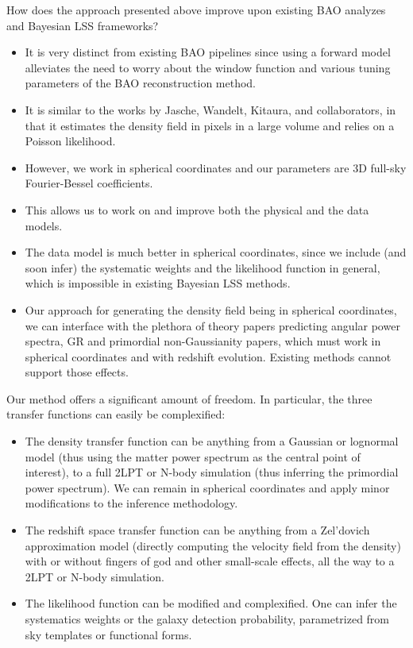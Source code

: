 \documentclass{aastex6}
\begin{document}
How does the approach presented above improve upon existing BAO analyzes and Bayesian LSS frameworks?
\begin{itemize}
	\item It is very distinct from existing BAO pipelines since using a forward model alleviates the need to worry about the window function and various tuning parameters of the BAO reconstruction method.
	\item	It is similar to the works by Jasche, Wandelt, Kitaura, and collaborators, in that it estimates the density field in pixels in a large volume and relies on a Poisson likelihood. 
	\item However, we work in spherical coordinates and our parameters are 3D full-sky Fourier-Bessel coefficients. 
	\item This allows us to work on and improve both the physical and the data models.
	\item The data model is much better in spherical coordinates, since we include (and soon infer) the systematic weights and the likelihood function in general, which is impossible in existing Bayesian LSS methods.
	\item Our approach for generating the density field being in spherical coordinates, we can interface with the plethora of theory papers predicting angular power spectra, GR and primordial non-Gaussianity papers, which must work in spherical coordinates and with redshift evolution. 
	Existing methods cannot support those effects.
\end{itemize}

Our method offers a significant amount of freedom. In particular, the three transfer functions can easily be complexified:
\begin{itemize}
	\item The density transfer function can be anything from a Gaussian or lognormal model (thus using the matter power spectrum as the central point of interest), to a full 2LPT or N-body simulation (thus inferring the primordial power spectrum). We can remain in spherical coordinates and apply minor modifications to the inference methodology.
	\item The redshift space transfer function can be anything from a Zel'dovich approximation model (directly computing the velocity field from the density) with or without fingers of god and other small-scale effects, all the way to a 2LPT or N-body simulation.
	\item The likelihood function can be modified and complexified. One can infer the systematics weights or the galaxy detection probability, parametrized from sky templates or functional forms.
\end{itemize}
\end{document}

